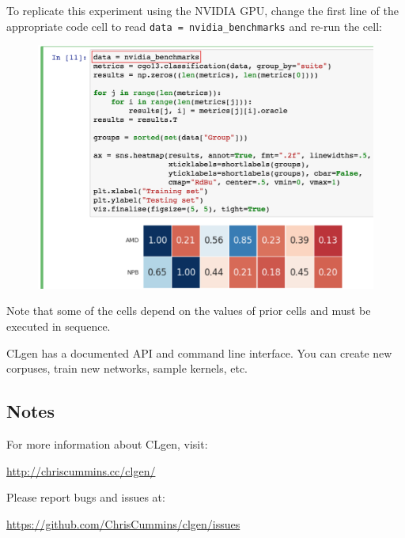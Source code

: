 \noindent
To replicate this experiment using the NVIDIA GPU, change the first line of the appropriate code cell to read \texttt{data = nvidia\_benchmarks} and re-run the cell:

\begin{figure}[H]
  \includegraphics[width=\columnwidth]{img/example-2}
\end{figure}

\noindent
Note that some of the cells depend on the values of prior cells and must be executed in sequence.

CLgen has a documented API and command line interface. You can create new corpuses, train new networks, sample kernels, etc.

\subsection{Notes}
For more information about CLgen, visit:

\url{http://chriscummins.cc/clgen/}

\noindent
Please report bugs and issues at:

\url{https://github.com/ChrisCummins/clgen/issues}